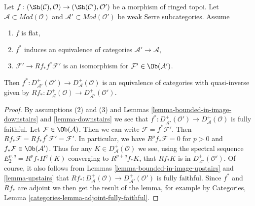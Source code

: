 \begin{lemma}
\label{lemma-equivalence-bounded}
Let $f : (\Sh(\mathcal{C}), \mathcal{O}) \to (\Sh(\mathcal{C}'), \mathcal{O}')$
be a morphism of ringed topoi.
Let $\mathcal{A} \subset \textit{Mod}(\mathcal{O})$
and $\mathcal{A}' \subset \textit{Mod}(\mathcal{O}')$
be weak Serre subcategories. Assume
\begin{enumerate}
\item $f$ is flat,
\item $f^*$ induces an equivalence of categories
$\mathcal{A}' \to \mathcal{A}$,
\item $\mathcal{F}' \to Rf_*f^*\mathcal{F}'$ is an isomorphism
for $\mathcal{F}' \in \Ob(\mathcal{A}')$.
\end{enumerate}
Then
$f^* : D_{\mathcal{A}'}^+(\mathcal{O}') \to D_\mathcal{A}^+(\mathcal{O})$
is an equivalence of categories with quasi-inverse given by
$Rf_* : D_\mathcal{A}^+(\mathcal{O}) \to D_{\mathcal{A}'}^+(\mathcal{O}')$.
\end{lemma}

\begin{proof}
By assumptions (2) and (3) and
Lemmas \ref{lemma-bounded-in-image-downstairs} and \ref{lemma-downstairs}
we see that
$f^* : D_{\mathcal{A}'}^+(\mathcal{O}') \to D_\mathcal{A}^+(\mathcal{O})$
is fully faithful.
Let $\mathcal{F} \in \Ob(\mathcal{A})$. Then we can write
$\mathcal{F} = f^*\mathcal{F}'$. Then
$Rf_*\mathcal{F} = Rf_* f^*\mathcal{F}' = \mathcal{F}'$.
In particular, we have $R^pf_*\mathcal{F} = 0$ for $p > 0$
and $f_*\mathcal{F} \in \Ob(\mathcal{A}')$.
Thus for any $K \in D^+_\mathcal{A}(\mathcal{O})$ we see,
using the spectral sequence $E_2^{p, q} = R^pf_*H^q(K)$
converging to $R^{p + q}f_*K$,
that $Rf_*K$ is in $D^+_{\mathcal{A}'}(\mathcal{O}')$.
Of course, it also follows from
Lemmas \ref{lemma-bounded-in-image-upstairs} and \ref{lemma-upstairs}
that $Rf_* : D_\mathcal{A}^+(\mathcal{O}) \to D_{\mathcal{A}'}^+(\mathcal{O}')$
is fully faithful. Since $f^*$ and $Rf_*$ are adjoint
we then get the result of the lemma, for example by
Categories, Lemma \ref{categories-lemma-adjoint-fully-faithful}.
\end{proof}

